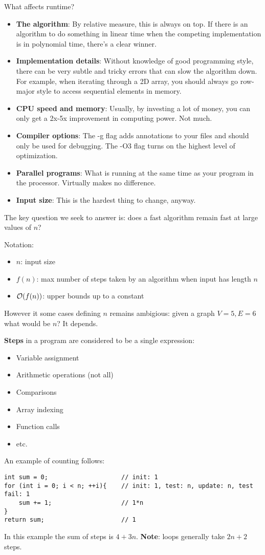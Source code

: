 What affects runtime?
\begin{itemize}
	\item \textbf{The algorithm}: By relative measure, this is always on top. If there is an algorithm to do something in linear time when the competing implementation is in polynomial time, there's a clear winner.
	\item \textbf{Implementation details}: Without knowledge of good programming style, there can be very subtle and tricky errors that can slow the algorithm down. For example, when iterating through a 2D array, you should always go row-major style to access sequential elements in memory.
	\item \textbf{CPU speed and memory}: Usually, by investing a lot of money, you can only get a 2x-5x improvement in computing power. Not much.
	\item \textbf{Compiler options}: The -g flag adds annotations to your files and should only be used for debugging. The -O3 flag turns on the highest level of optimization.
	\item \textbf{Parallel programs}: What is running at the same time as your program in the processor. Virtually makes no difference.
	\item \textbf{Input size}: This is the hardest thing to change, anyway.
\end{itemize}
The key question we seek to answer is: does a fast algorithm remain fast at large values of $n$?

Notation:
\begin{itemize}
	\item $n$: input size
	\item $f(n)$: max number of steps taken by an algorithm when input has length $n$
	\item $\mathcal{O}(f(n))$: upper bounds up to a constant
\end{itemize}
However it some cases defining $n$ remains ambigious: given a graph $V=5, E=6$ what would be $n$? It depends.

\textbf{Steps} in a program are considered to be a single expression: 
\begin{itemize}
	\item Variable assignment
	\item Arithmetic operations (not all)
	\item Comparisons
	\item Array indexing
	\item Function calls
	\item etc.
\end{itemize}
An example of counting follows:
\begin{lstlisting}[style=C++]
int sum = 0;					// init: 1
for (int i = 0; i < n; ++i){	// init: 1, test: n, update: n, test fail: 1
	sum += 1;					// 1*n
}
return sum;						// 1
\end{lstlisting}
In this example the sum of steps is $4+3n$. \textbf{Note}: loops generally take $2n+2$ steps.

